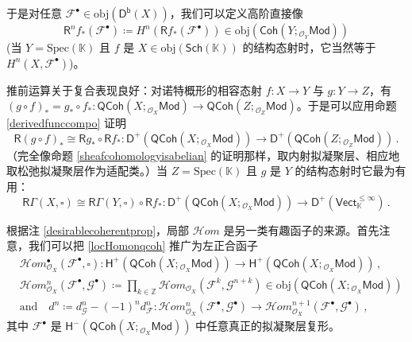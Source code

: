 于是对任意 $\mathcal{F}^\bullet\in\text{obj}(\mathsf{D^b}(X))$，我们可以定义高阶直接像
\begin{equation}
\mathsf{R}^nf_*(\mathcal{F}^\bullet)\coloneqq H^n(\mathsf{R}f_*(\mathcal{F}^\bullet))\in\text{obj}(\mathsf{Coh}(Y;{}_{\mathcal{O}_Y}\!\mathsf{Mod}))
\end{equation}
\big(当 $Y=\text{Spec}(\mathbb{K})$ 且 $f$ 是 $X\in\text{obj}(\mathsf{Sch}(\mathbb{K}))$ 的结构态射时，它当然等于 $H^n(X,\mathcal{F}^\bullet)$\big)。

\begin{Rem}
推前运算关于复合表现良好：对诺特概形的相容态射 $f:X\rightarrow Y$ 与 $g:Y\rightarrow Z$，有 $(g\circ f)_*=g_*\circ f_*:\mathsf{QCoh}(X;{}_{\mathcal{O}_X}\!\mathsf{Mod})\rightarrow\mathsf{QCoh}(Z;{}_{\mathcal{O}_Z}\!\mathsf{Mod})$。于是可以应用命题 \ref{derivedfunccompo} 证明
\[
\mathsf{R}(g\circ f)_*\cong\mathsf{R}g_*\circ\mathsf{R}f_*:\mathsf{D^+}(\mathsf{QCoh}(X;{}_{\mathcal{O}_X}\!\mathsf{Mod}))\rightarrow\mathsf{D^+}(\mathsf{QCoh}(Z;{}_{\mathcal{O}_Z}\!\mathsf{Mod}))\,.
\]
（完全像命题 \ref{sheafcohomologyisabelian} 的证明那样，取内射拟凝聚层、相应地取松弛拟凝聚层作为适配类。）当 $Z=\text{Spec}(\mathbb{K})$ 且 $g$ 是 $Y$ 的结构态射时它最为有用：
\begin{equation}\label{globalsectcompo}
	\mathsf{R}\Gamma(X,\square)\cong\mathsf{R}\Gamma(Y,\square)\circ\mathsf{R}f_*:\mathsf{D^+}(\mathsf{QCoh}(X;{}_{\mathcal{O}_X}\!\mathsf{Mod}))\rightarrow\mathsf{D^+}(\mathsf{Vect}_\mathbb{K}^{\leq\infty})\,.
\end{equation}
\end{Rem}

\vspace*{0.3cm}
\noindent 根据注 \ref{desirablecoherentprop}，局部 $\mathcal{H}om$ 是另一类有趣函子的来源。首先注意，我们可以把 \eqref{locHomonqcoh} 推广为左正合函子
\begin{equation}\label{locHomoncomplexes}
\begin{aligned}
	&\mathcal{H}om_{\mathcal{O}_X}^\bullet(\mathcal{F}^\bullet,\square):\mathsf{H^+}(\mathsf{QCoh}(X;{}_{\mathcal{O}_X}\!\mathsf{Mod}))\rightarrow\mathsf{H^+}(\mathsf{QCoh}(X;{}_{\mathcal{O}_X}\!\mathsf{Mod}))\,, \\
	&\mathcal{H}om_{\mathcal{O}_X}^n(\mathcal{F}^\bullet,\mathcal{G}^\bullet)\coloneqq \prod_{k\in\mathbb{Z}}\mathcal{H}om_{\mathcal{O}_X}(\mathcal{F}^k,\mathcal{G}^{n+k})\in\text{obj}(\mathsf{QCoh}(X;{}_{\mathcal{O}_X}\!\mathsf{Mod})) \\
	&\text{and}\quad d^n\coloneqq d_\mathcal{G}^n -(-1)^n d_\mathcal{F}^n:\mathcal{H}om_{\mathcal{O}_X}^n(\mathcal{F}^\bullet,\mathcal{G}^\bullet)\rightarrow \mathcal{H}om_{\mathcal{O}_X}^{n+1}(\mathcal{F}^\bullet,\mathcal{G}^\bullet)\,,
\end{aligned}
\end{equation}
其中 $\mathcal{F}^\bullet$ 是 $\mathsf{H^-}(\mathsf{QCoh}(X;{}_{\mathcal{O}_X}\!\mathsf{Mod}))$ 中任意真正的拟凝聚层复形。 

